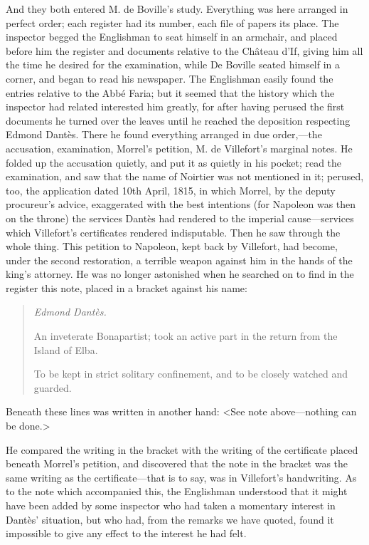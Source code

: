  And they both entered M. de Boville's study. Everything was here arranged in perfect order; each register had its number, each file of papers its place. The inspector begged the Englishman to seat himself in an armchair, and placed before him the register and documents relative to the Château d'If, giving him all the time he desired for the examination, while De Boville seated himself in a corner, and began to read his newspaper. The Englishman easily found the entries relative to the Abbé Faria; but it seemed that the history which the inspector had related interested him greatly, for after having perused the first documents he turned over the leaves until he reached the deposition respecting Edmond Dantès. There he found everything arranged in due order,—the accusation, examination, Morrel's petition, M. de Villefort's marginal notes. He folded up the accusation quietly, and put it as quietly in his pocket; read the examination, and saw that the name of Noirtier was not mentioned in it; perused, too, the application dated 10th April, 1815, in which Morrel, by the deputy procureur's advice, exaggerated with the best intentions (for Napoleon was then on the throne) the services Dantès had rendered to the imperial cause—services which Villefort's certificates rendered indisputable. Then he saw through the whole thing. This petition to Napoleon, kept back by Villefort, had become, under the second restoration, a terrible weapon against him in the hands of the king's attorney. He was no longer astonished when he searched on to find in the register this note, placed in a bracket against his name: 

\begin{quotation}\itshape
 Edmond Dantès. 

 An inveterate Bonapartist; took an active part in the return from the Island of Elba. 

 To be kept in strict solitary confinement, and to be closely watched and guarded. 
\end{quotation}

 Beneath these lines was written in another hand: <See note above—nothing can be done.> 

 He compared the writing in the bracket with the writing of the certificate placed beneath Morrel's petition, and discovered that the note in the bracket was the same writing as the certificate—that is to say, was in Villefort's handwriting.  As to the note which accompanied this, the Englishman understood that it might have been added by some inspector who had taken a momentary interest in Dantès' situation, but who had, from the remarks we have quoted, found it impossible to give any effect to the interest he had felt. 


